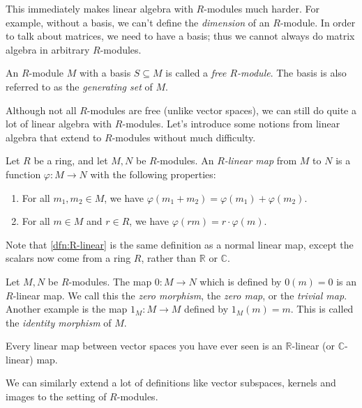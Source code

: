 This immediately makes linear algebra with $R$-modules much harder. For example, without a basis, we can't define the \emph{dimension} of an $R$-module. In order to talk about matrices, we need to have a basis; thus we cannot always do matrix algebra in arbitrary $R$-modules.

\begin{definition}\label{dfn:free-module}
	An $R$-module $M$ with a basis $S\subseteq M$ is called a \emph{free $R$-module}. The basis is also referred to as the \emph{generating set} of $M$.
\end{definition}

Although not all $R$-modules are free (unlike vector spaces), we can still do quite a lot of linear algebra with $R$-modules. Let's introduce some notions from linear algebra that extend to $R$-modules without much difficulty.

\begin{definition}\label{dfn:R-linear}
	Let $R$ be a ring, and let $M,N$ be $R$-modules. An \emph{$R$-linear map} from $M$ to $N$ is a function $\varphi : M \to N$ with the following properties:
	\begin{enumerate}
		\item For all $m_1,m_2\in M$, we have $\varphi (m_1+m_2) = \varphi (m_1)+\varphi (m_2)$.
		\item For all $m\in M$ and $r\in R$, we have $\varphi (r m)=r\cdot \varphi (m)$.
	\end{enumerate}
\end{definition}
Note that \cref{dfn:R-linear} is the same definition as a normal linear map, except the scalars now come from a ring $R$, rather than $\mathbb{R} $ or $\mathbb{C} $.

\begin{example}\label{ex:R-linear-1}
	Let $M,N$ be $R$-modules. The map $0: M \to N$ which is defined by $0(m)=0$ is an $R$-linear map. We call this the \emph{zero morphism}, the \emph{zero map}, or the \emph{trivial map}. Another example is the map $1_M : M \to M$ defined by $1_M(m) = m$. This is called the \emph{identity morphism} of $M$.
\end{example}

\begin{example}\label{ex:R-linear-2}
	Every linear map between vector spaces you have ever seen is an $\mathbb{R} $-linear (or $\mathbb{C} $-linear) map.
\end{example}

We can similarly extend a lot of definitions like vector subspaces, kernels and images to the setting of $R$-modules.

